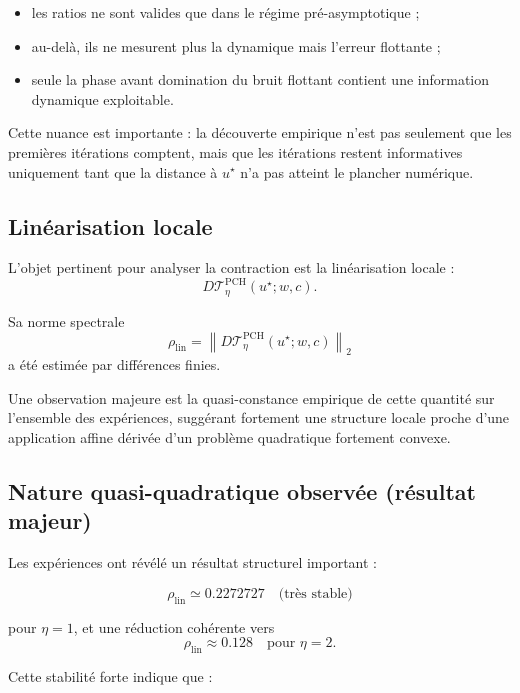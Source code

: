 \documentclass[11pt,a4paper]{article}
\newcommand{\1}{\mathbf 1}
\begin{document}
\begin{itemize}[leftmargin=2em]
\item les ratios ne sont valides que dans le régime pré-asymptotique ;
\item au-delà, ils ne mesurent plus la dynamique mais l’erreur flottante ;
\item seule la phase avant domination du bruit flottant contient une information dynamique exploitable.
\end{itemize}

Cette nuance est importante : la découverte empirique n’est pas seulement que les premières itérations comptent, mais que les itérations restent informatives uniquement tant que la distance à \(u^\star\) n’a pas atteint le plancher numérique.

\subsection{Linéarisation locale}

L’objet pertinent pour analyser la contraction est la linéarisation locale :
\[
D\mathcal T_\eta^{\mathrm{PCH}}(u^\star;w,c).
\]

Sa norme spectrale
\[
\rho_{\mathrm{lin}}
=
\left\|D\mathcal T_\eta^{\mathrm{PCH}}(u^\star;w,c)\right\|_2
\]
a été estimée par différences finies.

Une observation majeure est la quasi-constance empirique de cette quantité sur l’ensemble des expériences, suggérant fortement une structure locale proche d’une application affine dérivée d’un problème quadratique fortement convexe.

\subsection{Nature quasi-quadratique observée (résultat majeur)}

Les expériences ont révélé un résultat structurel important :

\[
\rho_{\mathrm{lin}} \simeq 0.2272727
\quad \text{(très stable)}
\]

pour \(\eta=1\), et une réduction cohérente vers
\[
\rho_{\mathrm{lin}} \approx 0.128
\quad \text{pour } \eta=2.
\]

Cette stabilité forte indique que :
\end{document}
